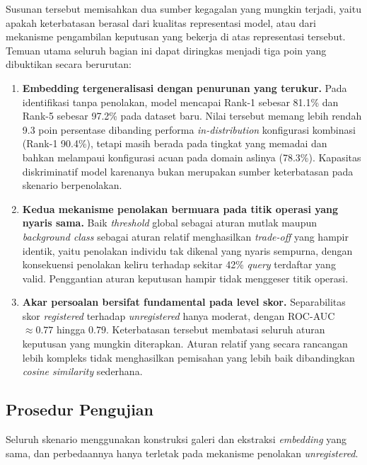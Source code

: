 Susunan tersebut memisahkan dua sumber kegagalan yang mungkin terjadi, yaitu apakah
keterbatasan berasal dari kualitas representasi model, atau dari mekanisme pengambilan
keputusan yang bekerja di atas representasi tersebut. Temuan utama seluruh bagian ini
dapat diringkas menjadi tiga poin yang dibuktikan secara berurutan:

\begin{enumerate}
    \item \textbf{Embedding tergeneralisasi dengan penurunan yang terukur.} Pada
          identifikasi tanpa penolakan, model mencapai Rank-1 sebesar 81.1\% dan Rank-5
          sebesar 97.2\% pada dataset baru. Nilai tersebut memang lebih rendah 9.3 poin
          persentase dibanding performa \textit{in-distribution} konfigurasi kombinasi
          (Rank-1 90.4\%), tetapi masih berada pada tingkat yang memadai dan bahkan
          melampaui konfigurasi acuan pada domain aslinya (78.3\%). Kapasitas
          diskriminatif model karenanya bukan merupakan sumber keterbatasan pada skenario
          berpenolakan.
    \item \textbf{Kedua mekanisme penolakan bermuara pada titik operasi yang nyaris
              sama.} Baik \textit{threshold} global sebagai aturan mutlak maupun
          \textit{background class} sebagai aturan relatif menghasilkan
          \textit{trade-off} yang hampir identik, yaitu penolakan individu tak dikenal
          yang nyaris sempurna, dengan konsekuensi penolakan keliru terhadap sekitar
          42\% \textit{query} terdaftar yang valid. Penggantian aturan keputusan hampir
          tidak menggeser titik operasi.
    \item \textbf{Akar persoalan bersifat fundamental pada level skor.} Separabilitas
          skor \textit{registered} terhadap \textit{unregistered} hanya moderat, dengan
          ROC-AUC $\approx 0{.}77$ hingga $0{.}79$. Keterbatasan tersebut membatasi
          seluruh aturan keputusan yang mungkin diterapkan. Aturan relatif yang secara
          rancangan lebih kompleks tidak menghasilkan pemisahan yang lebih baik
          dibandingkan \textit{cosine similarity} sederhana.
\end{enumerate}

\subsection{Prosedur Pengujian}
\label{subsec:openset_prosedur}

Seluruh skenario menggunakan konstruksi galeri dan ekstraksi \textit{embedding} yang
sama, dan perbedaannya hanya terletak pada mekanisme penolakan \textit{unregistered}.

